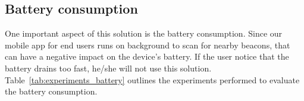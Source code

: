 %
%
%
% 
%
\subsection{Battery consumption}
\label{sub:methodology_battery_consumption}
One important aspect of this solution is the battery consumption.
Since our mobile app for end users runs on background to scan for nearby beacons, that can have a negative impact on the device's battery. If the user notice that the battery drains too fast, he/she will not use this solution.
Table~\ref{tab:experiments_battery} outlines the experiments performed to evaluate the battery consumption.



